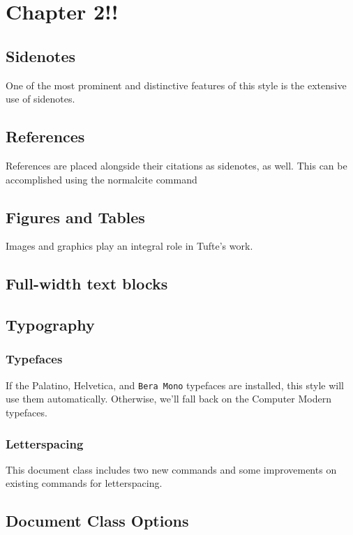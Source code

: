 \documentclass{tufte-book}
\begin{document}
\chapter[Chapter2]{Chapter 2!!}
\label{ch:ch2}

\section{Sidenotes}\label{sec:sidenotes}
One of the most prominent and distinctive features of this style is the
extensive use of sidenotes.

\section{References}
References are placed alongside their citations as sidenotes,
as well.  This can be accomplished using the normalcite command

\section{Figures and Tables}\label{sec:figures-and-tables}
Images and graphics play an integral role in Tufte's work.

\section{Full-width text blocks}

\section{Typography}\label{sec:typography}

\subsection{Typefaces}\label{sec:typefaces}
If the Palatino, \textsf{Helvetica}, and \texttt{Bera Mono} typefaces are installed, this style
will use them automatically.  Otherwise, we'll fall back on the Computer Modern
typefaces.

\subsection{Letterspacing}\label{sec:letterspacing}
This document class includes two new commands and some improvements on
existing commands for letterspacing.

\section{Document Class Options}\label{sec:options}
\end{document}
